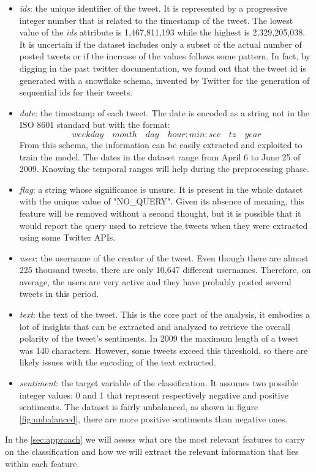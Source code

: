 \documentclass[conference]{IEEEtran}
\begin{document}
\begin{itemize}
    \item \textit{ids}: the unique identifier of the tweet. It is represented by a progressive integer number that is related to the timestamp of the tweet. The lowest value of the \textit{ids} attribute is 1,467,811,193 while the highest is 2,329,205,038. It is uncertain if the dataset includes only a subset of the actual number of posted tweets or if the increase of the values follows some pattern. In fact, by digging in the past twitter documentation, we found out that the tweet id is generated with a snowflake schema, invented by Twitter for the generation of sequential ids for their tweets.
    \item \textit{date}: the timestamp of each tweet. The date is encoded as a string not in the ISO 8601 standard\cite{iso8601} but with the format:
    $$weekday \quad month \quad day \quad hour:min:sec \quad tz \quad year$$
    From this schema, the information can be easily extracted and exploited to train the model. The dates in the dataset range from April 6 to June 25 of 2009. Knowing the temporal ranges will help during the preprocessing phase.
    \item \textit{flag}: a string whose significance is unsure. It is present in the whole dataset with the unique value of "NO\_QUERY". Given its absence of meaning, this feature will be removed without a second thought, but it is possible that it would report the query used to retrieve the tweets when they were extracted using some Twitter APIs.
    \item \textit{user}: the username of the creator of the tweet. Even though there are almost 225 thousand tweets, there are only 10,647 different usernames. Therefore, on average, the users are very active and they have probably posted several tweets in this period.
    \item \textit{text}: the text of the tweet. This is the core part of the analysis, it embodies a lot of insights that can be extracted and analyzed to retrieve the overall polarity of the tweet's sentiments. In 2009 the maximum length of a tweet was 140 characters\cite{tweet_lenght}. However, some tweets exceed this threshold, so there are likely issues with the encoding of the text extracted.
    \item \textit{sentiment}: the target variable of the classification. It assumes two possible integer values: 0 and 1 that represent respectively negative and positive sentiments. The dataset is fairly unbalanced, as shown in figure \ref{fig:unbalanced}, there are more positive sentiments than negative ones.
\end{itemize}
In the \ref{sec:approach} we will assess what are the most relevant features to carry on the classification and how we will extract the relevant information that lies within each feature.
\end{document}
